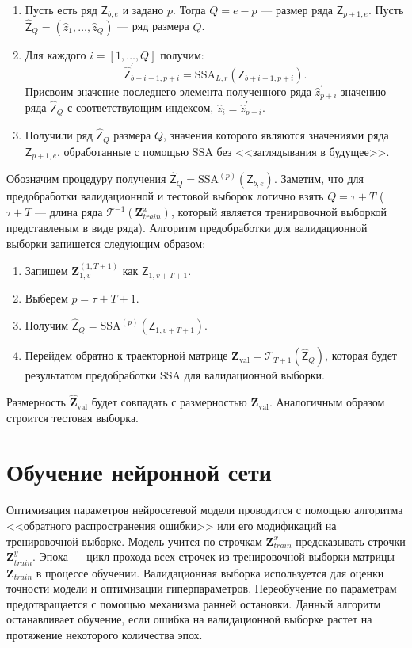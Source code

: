 \documentclass[specialist,
               substylefile = spbu.rtx,
               subf,href,colorlinks=true, 12p]{disser}
\begin{document}
\begin{enumerate}
	\item Пусть есть ряд $\mathsf{Z}_{b, e}$ и задано $p$. Тогда $Q = e - p$ --- размер ряда $ \mathsf{Z}_{p+1, e} $. Пусть $ \widehat{\mathsf{Z}}_Q = (\hat{z}_1, \ldots, \hat{z}_Q) $ --- ряд размера $Q$.
	\item Для каждого $ i = [1, \ldots, Q] $ получим: $$\widehat{\mathsf{Z}}^{'}_{b+i-1, p+i} = \mathrm{SSA}_{L, r}(\mathsf{Z}_{b+i-1, p+i}). $$
	Присвоим значение последнего элемента полученного ряда $\hat{z}^{'}_{p+i}$ значению ряда $\widehat{\mathsf{Z}}_Q$ с соответствующим индексом, $\hat{z}_i = \hat{z}^{'}_{p+i}$.
	\item Получили ряд $\widehat{\mathsf{Z}}_Q$ размера $ Q $, значения которого являются значениями ряда  $\mathsf{Z}_{p+1, e}$, обработанные с помощью SSA без <<заглядывания в будущее>>.
\end{enumerate}

Обозначим процедуру получения $\widehat{\mathsf{Z}}_Q = \mathrm{SSA}^{(p)}(\mathsf{Z}_{b, e})$. Заметим, что для предобработки валидационной и тестовой выборок логично взять $Q = \tau + T$ ($\tau + T$ --- длина ряда $\mathcal{T}^{-1}(\mathbf{Z}_{train}^x)$, который является тренировочной выборкой представленым в виде ряда). Алгоритм предобработки для валидационной выборки запишется следующим образом:

\begin{enumerate}
	\item Запишем $\mathbf{Z}_{1,v}^{(1, T+1)}$ как $\mathsf{Z}_{1, v + T + 1}$.
	\item Выберем $p = \tau + T + 1$.
	\item Получим $\widehat{\mathsf{Z}}_Q = \mathrm{SSA}^{(p)}(\mathsf{Z}_{1, v + T + 1})$.
	\item Перейдем обратно к траекторной матрице $\widehat{\mathbf{Z}}_{\mathrm{val}} = \mathcal{T}_{T+1}(\widehat{\mathsf{Z}}_Q) $, которая будет результатом предобработки SSA для валидационной выборки.
\end{enumerate}

Размерность $\widehat{\mathbf{Z}}_{\mathrm{val}}$ будет совпадать с размерностью $\mathbf{Z}_{\mathrm{val}}$. Аналогичным образом строится тестовая выборка.

\section{Обучение нейронной сети}

Оптимизация параметров нейросетевой модели проводится с помощью алгоритма <<обратного распространения ошибки>> или его модификаций на тренировочной выборке. Модель учится по строчкам $\mathbf{Z}^x_{train}$ предсказывать строчки $\mathbf{Z}^y_{train}$. Эпоха --- цикл прохода всех строчек из тренировочной выборки матрицы $\mathbf{Z}_{train}$ в процессе обучении. Валидационная выборка используется для оценки точности модели и оптимизации гиперпараметров. Переобучение по параметрам предотвращается с помощью механизма ранней остановки. Данный алгоритм останавливает обучение, если ошибка на валидационной выборке растет на протяжение некоторого количества эпох.
\end{document}
